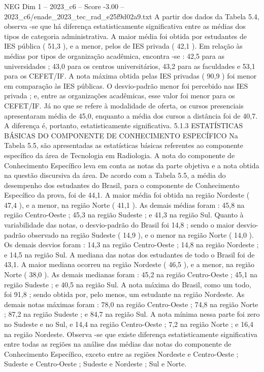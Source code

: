 \begin{textsample}{NEG Dim 1 – 2023\_c6 – Score -3.00 – 2023\_c6/enade\_2023\_tec\_rad\_e25f9d02a9.txt}
A partir dos dados da Tabela 5.4, observa -se que há diferença estatisticamente significativa entre as médias dos tipos de categoria administrativa.
A maior média foi obtida por estudantes de IES pública ( 51,3 ), e a menor, pelos de IES privada ( 42,1 ).
Em relação às médias por tipos de organização acadêmica, encontra -se : 42,5 para as universidades ; 43,0 para os centros universitários, 43,2 para as faculdades e 53,1 para os CEFET/IF.
A nota máxima obtida pelas IES privadas ( 90,9 ) foi menor em comparação às IES públicas.
O desvio-padrão menor foi percebido nas IES privada ; e, entre as organizações acadêmicas, esse valor foi menor para os CEFET/IF.
Já no que se refere à modalidade de oferta, os cursos presenciais apresentaram média de 45,0, enquanto a média dos cursos a distância foi de 40,7.
A diferença é, portanto, estatisticamente significativa. 5.1.3 ESTATÍSTICAS BÁSICAS DO COMPONENTE DE CONHECIMENTO ESPECÍFICO Na Tabela 5.5, são apresentadas as estatísticas básicas referentes ao componente específico da área de Tecnologia em Radiologia.
A nota do componente de Conhecimento Específico leva em conta as notas da parte objetiva e a nota obtida na questão discursiva da área.
De acordo com a Tabela 5.5, a média do desempenho dos estudantes do Brasil, para o componente de Conhecimento Específico da prova, foi de 44,1.
A maior média foi obtida na região Nordeste ( 47,4 ), e a menor, na região Norte ( 41,1 ).
As demais médias foram : 45,8 na região Centro-Oeste ; 45,3 na região Sudeste ; e 41,3 na região Sul.
Quanto à variabilidade das notas, o desvio-padrão do Brasil foi 14,8 ; sendo o maior desvio-padrão observado na região Sudeste ( 14,9 ), e o menor na região Norte ( 14,0 ).
Os demais desvios foram : 14,3 na região Centro-Oeste ; 14,8 na região Nordeste ; e 14,5 na região Sul.
A mediana das notas dos estudantes de todo o Brasil foi de 43,1.
A maior mediana ocorreu na região Nordeste ( 46,5 ), e a menor, na região Norte ( 38,0 ).
As demais medianas foram : 45,2 na região Centro-Oeste ; 45,1 na região Sudeste ; e 40,5 na região Sul.
A nota máxima do Brasil, como um todo, foi 91,8 ; sendo obtida por, pelo menos, um estudante na região Nordeste.
As demais notas máximas foram : 78,0 na região Centro-Oeste ; 74,8 na região Norte ; 87,2 na região Sudeste ; e 84,7 na região Sul.
A nota mínima nessa parte foi zero no Sudeste e no Sul, e 14,4 na região Centro-Oeste ; 7,2 na região Norte ; e 16,4 na região Nordeste.
Observa -se que existe diferença estatisticamente significativa entre todas as regiões na análise das médias das notas do componente de Conhecimento Específico, exceto entre as regiões Nordeste e Centro-Oeste ; Sudeste e Centro-Oeste ; Sudeste e Nordeste ; Sul e Norte.

\end{textsample}
